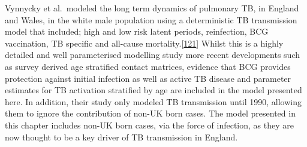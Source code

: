 \documentclass[11pt,twoside]{bristolthesis}
\begin{document}
  Vynnycky et al.~modeled the long term dynamics of pulmonary TB, in England and Wales, in the white male population using a deterministic TB transmission model that included; high and low risk latent periods, reinfection, BCG vaccination, TB specific and all-cause mortality.{[}\protect\hyperlink{ref-Vynnycky1997a}{121}{]} Whilst this is a highly detailed and well parameterised modelling study more recent developments such as survey derived age stratified contact matrices, evidence that BCG provides protection against initial infection as well as active TB disease and parameter estimates for TB activation stratified by age are included in the model presented here. In addition, their study only modeled TB transmission until 1990, allowing them to ignore the contribution of non-UK born cases. The model presented in this chapter includes non-UK born cases, via the force of infection, as they are now thought to be a key driver of TB transmission in England.
  
\end{document}
